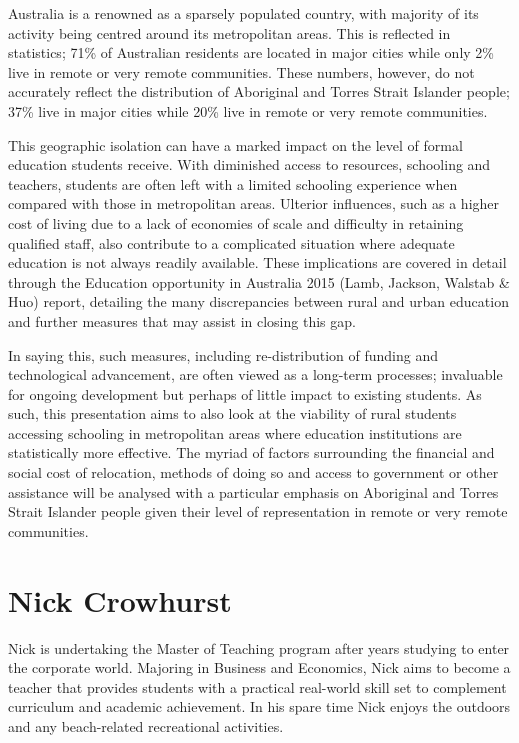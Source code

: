 \documentclass[twoside,12pt,a4paper,notitlepage]{memoir}
\begin{document}
Australia is a renowned as a sparsely populated country, with majority of its activity being centred around its metropolitan areas. This is reflected in statistics; 71\% of Australian residents are located in major cities while only 2\% live in remote or very remote communities. These numbers, however, do not accurately reflect the distribution of Aboriginal and Torres Strait Islander people; 37\% live in major cities while 20\% live in remote or very remote communities.
 
This geographic isolation can have a marked impact on the level of formal education students receive. With diminished access to resources, schooling and teachers, students are often left with a limited schooling experience when compared with those in metropolitan areas. Ulterior influences, such as a higher cost of living due to a lack of economies of scale and difficulty in retaining qualified staff, also contribute to a complicated situation where adequate education is not always readily available. These implications are covered in detail through the Education opportunity in Australia 2015 (Lamb, Jackson, Walstab \& Huo) report, detailing the many discrepancies between rural and urban education and further measures that may assist in closing this gap.
 
In saying this, such measures, including re-distribution of funding and technological advancement, are often viewed as a long-term processes; invaluable for ongoing development but perhaps of little impact to existing students. As such, this presentation aims to also look at the viability of rural students accessing schooling in metropolitan areas where education institutions are statistically more effective. The myriad of factors surrounding the financial and social cost of relocation, methods of doing so and access to government or other assistance will be analysed with a particular emphasis on Aboriginal and Torres Strait Islander people given their level of representation in remote or very remote communities.

\section*{Nick Crowhurst}

Nick is undertaking the Master of Teaching program after years studying to enter the corporate world. Majoring in Business and Economics, Nick aims to become a teacher that provides students with a practical real-world skill set to complement curriculum and academic achievement. In his spare time Nick enjoys the outdoors and any beach-related recreational activities. 
\end{document}
